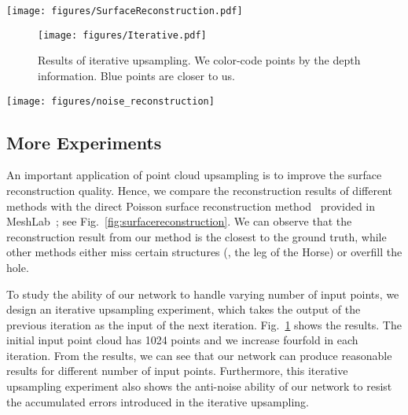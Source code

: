 \begin{figure*}[t]
	\centering
	\texttt{[image: figures/SurfaceReconstruction.pdf]}\vspace{1mm}
	\vspace{-2mm}
	\caption{Surface reconstruction results from the upsampled point clouds.}
	\label{fig:surfacereconstruction}
	\vspace{-3.5mm}
\end{figure*} 

\begin{figure}[htbp]
	\centering
	\texttt{[image: figures/Iterative.pdf]}\vspace{1mm}
	\vspace{-1mm}
	\caption{Results of iterative upsampling. We color-code points by the depth information. Blue points are closer to us.}
	\label{fig:iterative}
\end{figure}

\begin{figure*}[!t]
	\centering
	\texttt{[image: figures/noise\_reconstruction]}
	\caption{Surface reconstruction results from noisy input points.}
	\label{fig:noise}\vspace{-2mm}
\end{figure*}



\subsection{More Experiments}
\label{sec:moreresults}

An important application of point cloud upsampling is to improve the surface reconstruction quality.
Hence, we compare the reconstruction results of different methods with the direct Poisson surface reconstruction method~\cite{poisson2006} provided in MeshLab~\cite{LocalChapterEvents:ItalChap:ItalianChapConf2008:129-136}; see Fig.~\ref{fig:surfacereconstruction}. 
We can observe that the reconstruction result from our method is the closest to the ground truth, while other methods either miss certain structures (\eg, the leg of the Horse) or overfill the hole.

To study the ability of our network to handle varying number of input points, we design an iterative upsampling experiment, which takes the output of the previous iteration as the input of the next iteration.
Fig.~\ref{fig:iterative} shows the results.
The initial input point cloud has 1024 points and we increase fourfold in each iteration.
From the results, we can see that our network can produce reasonable results for different number of input points.
Furthermore, this iterative upsampling experiment also shows the anti-noise ability of our network to resist the accumulated errors introduced in the iterative upsampling.



